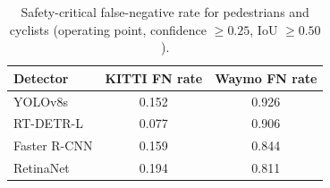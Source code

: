 \begin{table}[t]
    \centering
    \caption{Safety-critical false-negative rate for pedestrians and cyclists (operating point, confidence $\geq 0.25$, IoU $\geq 0.50$).}
    \label{tab:safety_fn}
    \begin{tabular}{lcc}
        \toprule
        Detector & KITTI FN rate & Waymo FN rate \\
        \midrule
        YOLOv8s & 0.152 & 0.926 \\
        RT-DETR-L & 0.077 & 0.906 \\
        Faster R-CNN & 0.159 & 0.844 \\
        RetinaNet & 0.194 & 0.811 \\
        \bottomrule
    \end{tabular}
\end{table}
